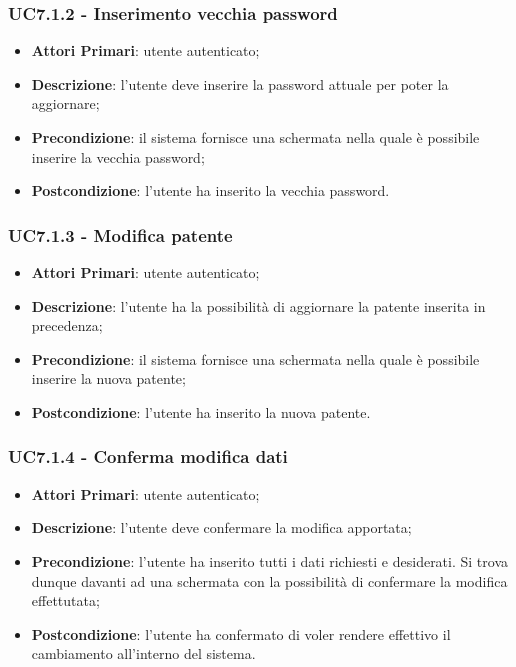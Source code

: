\subsubsection{UC7.1.2 - Inserimento vecchia password}
\begin{itemize}
	\item \textbf{Attori Primari}: utente autenticato;
	\item \textbf{Descrizione}: l'utente deve inserire la password attuale per poter la aggiornare;
	\item \textbf{Precondizione}: il sistema fornisce una schermata nella quale è possibile inserire la vecchia password;
	\item \textbf{Postcondizione}: l'utente ha inserito la vecchia password.
\end{itemize}

\subsubsection{UC7.1.3 - Modifica patente}
\begin{itemize}
	\item \textbf{Attori Primari}: utente autenticato;
	\item \textbf{Descrizione}: l'utente ha la possibilità di aggiornare la patente inserita in precedenza;
	\item \textbf{Precondizione}: il sistema fornisce una schermata nella quale è possibile inserire la nuova patente;
	\item \textbf{Postcondizione}: l'utente ha inserito la nuova patente.
\end{itemize}

\subsubsection{UC7.1.4 - Conferma modifica dati}
\begin{itemize}
	\item \textbf{Attori Primari}: utente autenticato;
	\item \textbf{Descrizione}: l'utente deve 
	confermare la modifica apportata;
	\item \textbf{Precondizione}: l'utente ha inserito tutti i dati richiesti e desiderati. Si trova dunque davanti ad una schermata con la possibilità di confermare la modifica effettutata;
	\item \textbf{Postcondizione}: l'utente ha confermato di voler rendere effettivo il cambiamento all'interno del sistema.
\end{itemize}


